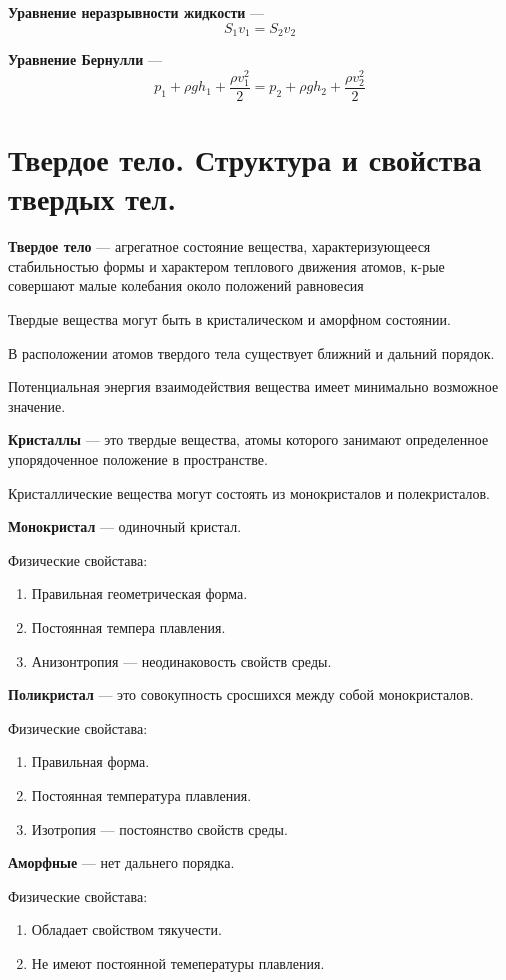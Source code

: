 \documentclass{report}
\begin{document}
{\bf Уравнение неразрывности жидкости} ---
$$
S_1v_1=S_2v_2
$$

{\bf Уравнение Бернулли} ---
$$
p_1+\rho gh_1+\frac{\rho v_1^2}{2}=p_2+\rho gh_2+\frac{\rho v_2^2}{2}
$$



\part{Твердое тело. 
Структура и свойства твердых тел.}

{\bf Твердое тело} ---
агрегатное состояние вещества, характеризующееся стабильностью формы и характером 
теплового движения атомов, к-рые совершают малые колебания около положений равновесия

Твердые вещества могут быть в кристалическом и аморфном состоянии.

В расположении атомов твердого тела существует ближний и дальний порядок.

Потенциальная энергия взаимодействия вещества имеет минимально возможное значение.

{\bf Кристаллы} ---
это твердые вещества, атомы которого занимают определенное упорядоченное положение в пространстве.

Кристаллические вещества могут состоять из монокристалов и полекристалов.

{\bf Монокристал} ---
одиночный кристал.

Физические свойстава:
\begin{enumerate}
  \item Правильная геометрическая форма.
  \item Постоянная темпера плавления.
  \item Анизонтропия --- неодинаковость свойств среды. 
\end{enumerate}

{\bf Поликристал} ---
это совокупность сросшихся между собой монокристалов.

Физические свойстава:
\begin{enumerate}
  \item Правильная форма.
  \item Постоянная температура плавления.
  \item Изотропия --- постоянство свойств среды.
\end{enumerate}

{\bf Аморфные} ---
нет дальнего порядка.

Физические свойстава:
\begin{enumerate}
  \item Обладает свойством тякучести.
  \item Не имеют постоянной темепературы плавления.
\end{enumerate}
\end{document}
